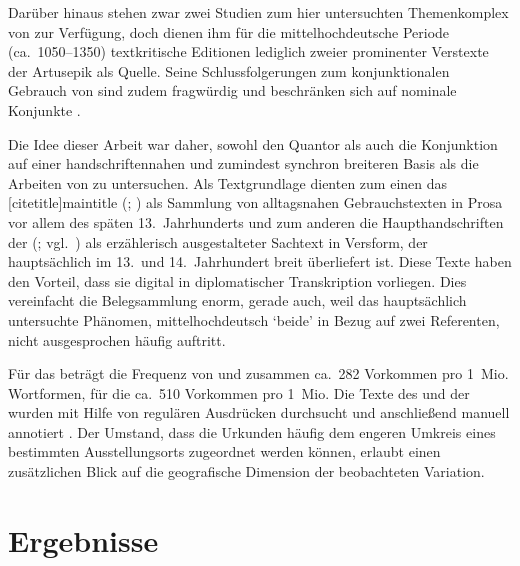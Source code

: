 Darüber hinaus stehen zwar zwei Studien zum hier untersuchten Themenkomplex von
\citet{askedal1973,askedal1974} zur Verfügung, doch dienen ihm für die
mittelhochdeutsche Periode (ca.~1050--1350) textkritische
Editionen lediglich zweier prominenter Verstexte der Artusepik als Quelle.
Seine Schlussfolgerungen zum konjunktionalen Gebrauch von 
\autocite{askedal1974} sind zudem fragwürdig und beschränken sich auf nominale
Konjunkte \autocite{gjelsten1980}.

Die Idee dieser Arbeit war daher, sowohl den Quantor als auch die Konjunktion
 auf einer handschriftennahen und zumindest synchron breiteren
Basis als die Arbeiten von \citet{askedal1973,askedal1974} zu untersuchen. Als
Textgrundlage dienten zum einen das [citetitle]{maintitle}
(\CAO{}; \nosh\cites{cao1,cao2,cao3,cao4,caor,cao5}) als Sammlung von
alltagsnahen Gebrauchstexten in Prosa vor allem des späten 13.~Jahrhunderts und
zum anderen die Haupthandschriften der  (\KC{};
vgl.~\cites{schroeder1895,nellmann1983}) als erzählerisch ausgestalteter
Sachtext in Versform, der hauptsächlich im 13.\ und 14.\ Jahrhundert breit
über\-liefert ist. Diese Texte haben den Vorteil, dass sie digital in
diplomatischer Transkription vorliegen. Dies vereinfacht die Belegsammlung
enorm, gerade auch, weil das hauptsächlich untersuchte Phänomen,
mittelhochdeutsch  `beide' in Bezug auf zwei
Referenten, nicht ausgesprochen häufig auftritt.

Für das \CAO{} beträgt die Frequenz von  und  zusammen
ca.~282 Vorkommen pro 1~Mio. Wortformen, für die \KC{} ca.~510 Vorkommen pro
1~Mio. Die Texte des \CAO{} und der \KC{} wurden mit Hilfe von regulären
Ausdrücken durchsucht und anschließend manuell annotiert \autocites[vgl.\
z.\,B.][33--37]{perkuhnetal2012}[zur Methode
vgl.][207--209]{beckerschallert2021}[155--158]{beckerschallert2022b}. Der
Umstand, dass die Urkunden häufig dem engeren Umkreis eines bestimmten
Ausstellungs\-orts zugeordnet werden können, erlaubt einen zusätzlichen Blick
auf die geografische\is{Dialektgeografie} Dimension der beobachteten Variation.%

\section{Ergebnisse}

